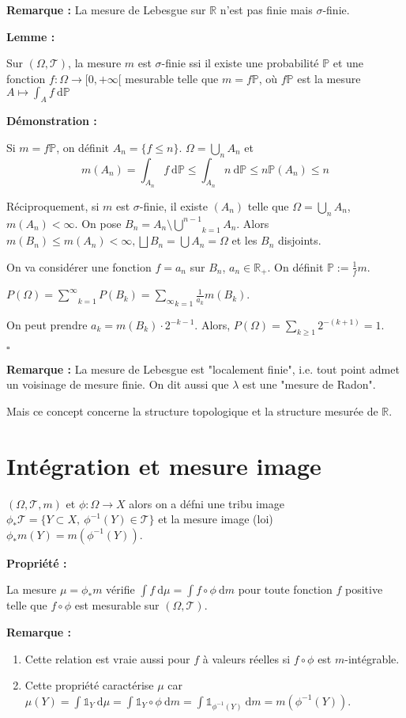 \documentclass[10pt,a4paper,notitlepage ]{report}
\newcommand{\R}{\mathbb R}
\newcommand{\T}{\mathcal T}
\newcommand{\dd}{\ \mathrm d}
\newcommand{\1}{\mathds 1}
\newcommand{\prob}{\mathbb P}
\newcounter{th}
\newenvironment{propriete}[1][]{
	\begin{tcolorbox}
		\textbf{Propriété #1 : }
}
{\end{tcolorbox}}
\newenvironment{demo}[1][]{

	\textbf{Démonstration #1 :}
}{\begin{flushright}
	$\square$
\end{flushright}
}
\newenvironment{lemme}[1][]{
	\begin{tcolorbox}
		\textbf{Lemme #1 : }
	}
	{\end{tcolorbox}}
\newenvironment{rem}{
	
		\textbf{Remarque :}}{}
\begin{document}
\begin{rem}
	La mesure de Lebesgue sur $\R$ n'est pas finie mais $\sigma$-finie.
\end{rem}

\begin{lemme}
	Sur $(\Omega,\T)$, la mesure $m$ est $\sigma$-finie ssi il existe une probabilité $\prob$ et une fonction $f:\Omega \rightarrow [0,+\infty[$ mesurable telle que $m=f\prob$, où $f\prob$ est la mesure $A\mapsto \int_A f\dd\prob$
\end{lemme}

\begin{demo}
	Si $m=f\prob$, on définit $A_n=\{f\le n\}$.
	$\Omega = \underset n \bigcup A_n$ et 
	\[m(A_n) = \int_{A_n}f\dd\prob \le \int_{A_n}n\dd\prob \le n\prob(A_n) \le n\]
	
	Réciproquement, si $m$ est $\sigma$-finie, il existe $(A_n)$ telle que $\Omega = \underset n \bigcup A_n$, $m(A_n) < \infty$. On pose $B_n = A_n \setminus \underset{k=1} {\overset {n-1} \bigcup} A_n$. Alors $m(B_n) \le m(A_n) < \infty, \bigsqcup B_n = \bigcup A_n = \Omega$ et les $B_n$ disjoints.
	
	On va considérer une fonction $f=a_n$ sur $B_n$, $a_n \in \R_+$. On définit $\prob := \frac 1 f m$.
	
	$P(\Omega) = \underset{k=1}{\overset \infty \sum} P(B_k) = \underset{k=1}{\underset \infty \sum} \frac 1 {a_k} m(B_k)$.
	
	On peut prendre $a_k=m(B_k)\cdot 2^{-k-1}$. Alors, $P(\Omega) = \sum_{k\ge 1} 2^{-(k+1)} = 1$.
\end{demo}

\begin{rem}
	La mesure de Lebesgue est "localement finie", i.e. tout point admet un voisinage de mesure finie. On dit aussi que $\lambda$ est une "mesure de Radon".
	
	Mais ce concept concerne la structure topologique et la structure mesurée de $\R$.
\end{rem}

\section{Intégration et mesure image}
	$(\Omega,\T,m)$ et $\phi:\Omega \rightarrow X$ alors on a défni une tribu image $\phi_*\T = \{Y\subset X,\ \phi^{-1}(Y)\in\T\}$ et la mesure image (loi) $\phi_*m(Y) = m(\phi^{-1}(Y))$.

\begin{propriete}
	La mesure $\mu=\phi_*m$ vérifie $\int f\dd\mu = \int f \circ \phi \dd m$ pour toute fonction $f$ positive telle que $f\circ \phi$ est mesurable sur $(\Omega,\T)$.
\end{propriete}
\begin{rem}
	\begin{enumerate}
		\item Cette relation est vraie aussi pour $f$ à valeurs réelles si $f\circ\phi$ est $m$-intégrable.
		\item Cette propriété caractérise $\mu$ car $\mu(Y)=\int\1_Y\dd\mu = \int \1_Y \circ \phi \dd m = \int \1_{\phi^{-1}(Y)}\dd m = m(\phi^{-1}(Y))$.
	\end{enumerate}
\end{rem}
\end{document}
